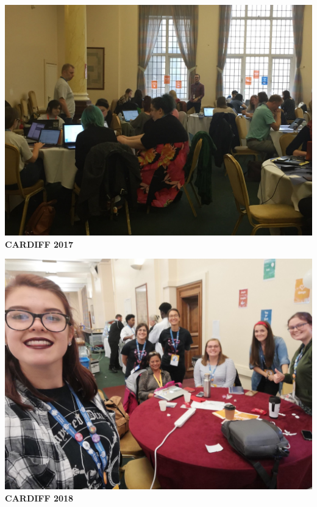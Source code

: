 \documentclass{beamer}
\begin{document}
\begin{frame}
    \begin{center}
    \begin{minipage}{.45\textwidth}
        \centering
    \includegraphics[width=\textwidth]{static/cardiff_2017} \\
    \textbf{CARDIFF 2017}
    \end{minipage}
    \begin{minipage}{.45\textwidth}
        \centering
        \includegraphics[width=\textwidth]{static/cardiff_2018} \\
        \textbf{CARDIFF 2018}
    \end{minipage}
\end{center}
\end{frame}
\end{document}
